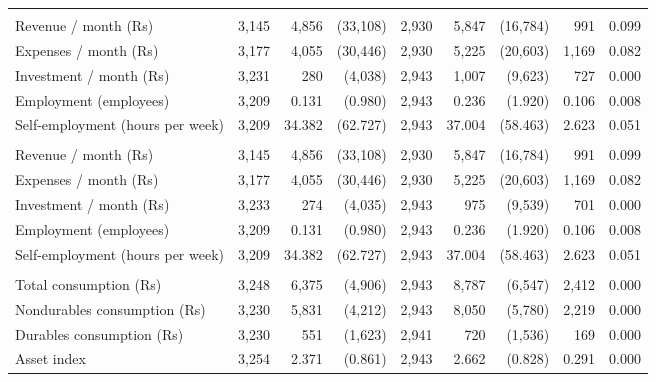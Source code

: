 \begin{table}[H]
{\begin{tabular}{lrrrrrrrr}
\addlinespace[0.3em]
\multicolumn{9}{l}{\textbf{Businesses}}\\
\hspace{1em}Revenue / month (Rs) & 3,145 & 4,856 & (33,108) & 2,930 & 5,847 & (16,784) & 991 & \vphantom{1}0.099\\
\hspace{1em}Expenses / month (Rs) & 3,177 & 4,055 & (30,446) & 2,930 & 5,225 & (20,603) & 1,169 & \vphantom{1}0.082\\
\hspace{1em}Investment / month (Rs) & 3,231 & 280 & (4,038) & 2,943 & 1,007 & (9,623) & 727 & 0.000\\
\hspace{1em}Employment (employees) & 3,209 & 0.131 & (0.980) & 2,943 & 0.236 & (1.920) & 0.106 & \vphantom{1}0.008\\
\hspace{1em}Self-employment (hours per week) & 3,209 & 34.382 & (62.727) & 2,943 & 37.004 & (58.463) & 2.623 & \vphantom{1}0.051\\
\addlinespace[0.3em]
\multicolumn{9}{l}{\textbf{Businesses (all households)}}\\
\hspace{1em}Revenue / month (Rs) & 3,145 & 4,856 & (33,108) & 2,930 & 5,847 & (16,784) & 991 & 0.099\\
\hspace{1em}Expenses / month (Rs) & 3,177 & 4,055 & (30,446) & 2,930 & 5,225 & (20,603) & 1,169 & 0.082\\
\hspace{1em}Investment / month (Rs) & 3,233 & 274 & (4,035) & 2,943 & 975 & (9,539) & 701 & 0.000\\
\hspace{1em}Employment (employees) & 3,209 & 0.131 & (0.980) & 2,943 & 0.236 & (1.920) & 0.106 & 0.008\\
\hspace{1em}Self-employment (hours per week) & 3,209 & 34.382 & (62.727) & 2,943 & 37.004 & (58.463) & 2.623 & 0.051\\
\addlinespace[0.3em]
\multicolumn{9}{l}{\textbf{Consumption (per household per month)}}\\
\hspace{1em}Total consumption (Rs) & 3,248 & 6,375 & (4,906) & 2,943 & 8,787 & (6,547) & 2,412 & 0.000\\
\hspace{1em}Nondurables consumption (Rs) & 3,230 & 5,831 & (4,212) & 2,943 & 8,050 & (5,780) & 2,219 & 0.000\\
\hspace{1em}Durables consumption (Rs) & 3,230 & 551 & (1,623) & 2,941 & 720 & (1,536) & 169 & 0.000\\
\hspace{1em}Asset index & 3,254 & 2.371 & (0.861) & 2,943 & 2.662 & (0.828) & 0.291 & 0.000\\
\bottomrule
\end{tabular}}
\end{table}
